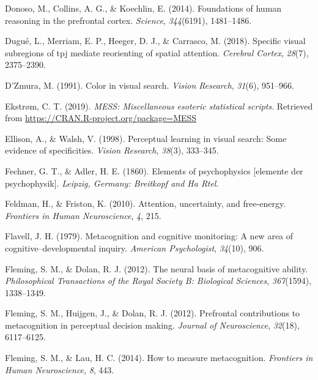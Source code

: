 \documentclass[12pt,twoside]{reedthesis}
\begin{document}
\leavevmode\hypertarget{ref-donoso2014foundations}{}%
Donoso, M., Collins, A. G., \& Koechlin, E. (2014). Foundations of human reasoning in the prefrontal cortex. \emph{Science}, \emph{344}(6191), 1481--1486.

\leavevmode\hypertarget{ref-dugue2018specific}{}%
Dugué, L., Merriam, E. P., Heeger, D. J., \& Carrasco, M. (2018). Specific visual subregions of tpj mediate reorienting of spatial attention. \emph{Cerebral Cortex}, \emph{28}(7), 2375--2390.

\leavevmode\hypertarget{ref-d1991color}{}%
D'Zmura, M. (1991). Color in visual search. \emph{Vision Research}, \emph{31}(6), 951--966.

\leavevmode\hypertarget{ref-R-MESS}{}%
Ekstrøm, C. T. (2019). \emph{MESS: Miscellaneous esoteric statistical scripts}. Retrieved from \url{https://CRAN.R-project.org/package=MESS}

\leavevmode\hypertarget{ref-ellison1998perceptual}{}%
Ellison, A., \& Walsh, V. (1998). Perceptual learning in visual search: Some evidence of specificities. \emph{Vision Research}, \emph{38}(3), 333--345.

\leavevmode\hypertarget{ref-fechner1860elements}{}%
Fechner, G. T., \& Adler, H. E. (1860). Elements of psychophysics {[}elemente der psychophysik{]}. \emph{Leipzig, Germany: Breitkopf and Ha Rtel}.

\leavevmode\hypertarget{ref-feldman2010attention}{}%
Feldman, H., \& Friston, K. (2010). Attention, uncertainty, and free-energy. \emph{Frontiers in Human Neuroscience}, \emph{4}, 215.

\leavevmode\hypertarget{ref-flavell1979metacognition}{}%
Flavell, J. H. (1979). Metacognition and cognitive monitoring: A new area of cognitive--developmental inquiry. \emph{American Psychologist}, \emph{34}(10), 906.

\leavevmode\hypertarget{ref-fleming2012neural}{}%
Fleming, S. M., \& Dolan, R. J. (2012). The neural basis of metacognitive ability. \emph{Philosophical Transactions of the Royal Society B: Biological Sciences}, \emph{367}(1594), 1338--1349.

\leavevmode\hypertarget{ref-fleming2012prefrontal}{}%
Fleming, S. M., Huijgen, J., \& Dolan, R. J. (2012). Prefrontal contributions to metacognition in perceptual decision making. \emph{Journal of Neuroscience}, \emph{32}(18), 6117--6125.

\leavevmode\hypertarget{ref-fleming2014measure}{}%
Fleming, S. M., \& Lau, H. C. (2014). How to measure metacognition. \emph{Frontiers in Human Neuroscience}, \emph{8}, 443.
\end{document}
